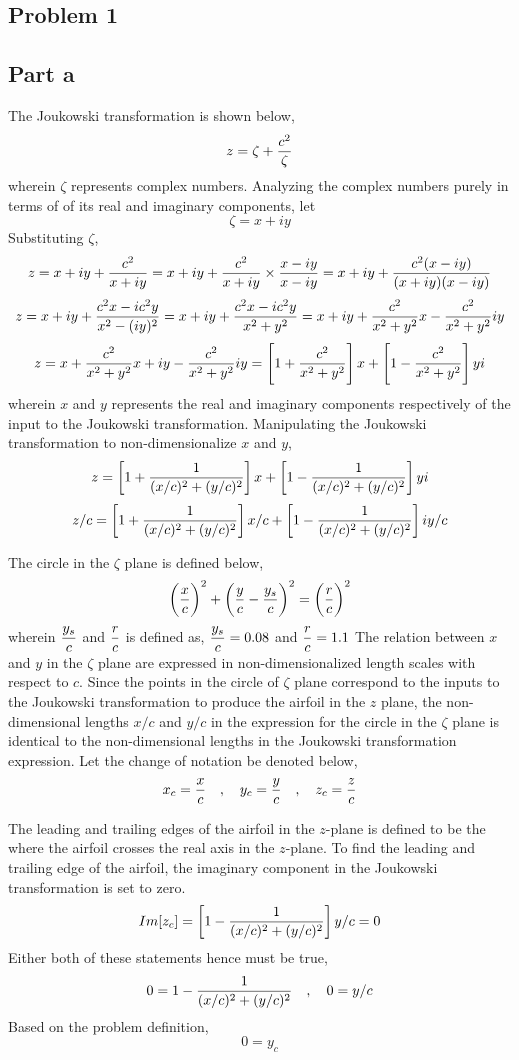 \documentclass[class=report, 12pt, crop=false]{standalone}
\begin{document}
\begin{center}


\section{Problem 1}
\begin{comment}
\end{comment}
\subsection{Part a}
The Joukowski transformation is shown below,
$$z = \zeta + \frac{c^2}{\zeta}$$
wherein $\zeta$ represents complex numbers. Analyzing the complex numbers purely in terms of of its real and imaginary components, let
$$\zeta = x + iy$$
Substituting $\zeta$,
$$z = x + iy + \frac{c^2}{x + iy} = x + iy + \frac{c^2}{x + iy}\times\frac{x-iy}{x-iy} = x + iy + \frac{c^2(x-iy)}{(x + iy)(x-iy)}$$
$$z = x + iy + \frac{c^2x-ic^2y}{x^2-(iy)^2} = x + iy + \frac{c^2x-ic^2y}{x^2+y^2} = x + iy + \frac{c^2}{x^2+y^2}x - \frac{c^2}{x^2+y^2}iy$$
$$z = x + \frac{c^2}{x^2+y^2}x + iy - \frac{c^2}{x^2+y^2}iy = \left[1+\frac{c^2}{x^2+y^2}\right]x + \left[1-\frac{c^2}{x^2+y^2}\right]yi$$
wherein $x$ and $y$ represents the real and imaginary components respectively of the input to the Joukowski transformation. Manipulating the Joukowski transformation to non-dimensionalize $x$ and $y$,
$$z = \left[1+\frac{1}{(x/c)^2+(y/c)^2}\right]x + \left[1-\frac{1}{(x/c)^2+(y/c)^2}\right]yi$$
$$z/c = \left[1+\frac{1}{(x/c)^2+(y/c)^2}\right]x/c + \left[1-\frac{1}{(x/c)^2+(y/c)^2}\right]iy/c$$


The circle in the $\zeta$ plane is defined below,
$$\left(\frac{x}{c}\right)^2 + \left(\frac{y}{c}-\frac{y_s}{c}\right)^2 = \left(\frac{r}{c}\right)^2$$
wherein $\displaystyle{\frac{y_s}{c}}$ and $\displaystyle{\frac{r}{c}}$ is defined as, $\displaystyle{\frac{y_s}{c} = 0.08}$ and $\displaystyle{\frac{r}{c} = 1.1}$
The relation between $x$ and $y$ in the $\zeta$ plane are expressed in non-dimensionalized length scales with respect to $c$. Since the points in the circle of $\zeta$ plane correspond to the inputs to the Joukowski transformation to produce the airfoil in the $z$ plane, the non-dimensional lengths $x/c$ and $y/c$ in the expression for the circle in the $\zeta$ plane is identical to the non-dimensional lengths in the Joukowski transformation expression. Let the change of notation be denoted below,
$$x_c = \frac{x}{c}\quad,\quad y_c = \frac{y}{c}\quad,\quad z_c = \frac{z}{c}$$


The leading and trailing edges of the airfoil in the $z$-plane is defined to be the where the airfoil crosses the real axis in the $z$-plane. To find the leading and trailing edge of the airfoil, the imaginary component in the Joukowski transformation is set to zero.
$$Im[z_c] = \left[1-\frac{1}{(x/c)^2+(y/c)^2}\right]y/c = 0$$
Either both of these statements hence must be true,
$$0 = 1-\frac{1}{(x/c)^2+(y/c)^2} \quad,\quad 0 = y/c$$
Based on the problem definition, 
$$0 = y_c$$


\end{center}
\end{document}
